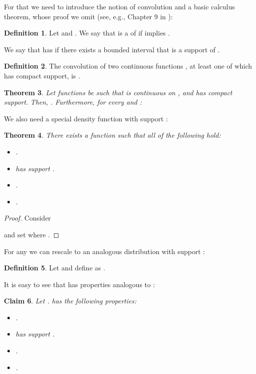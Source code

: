 \documentclass{daj}
\newcommand{\1}{\mathbbm{1}}
\theoremstyle{plain}
\newtheorem{theorem}{Theorem}[section]
\newtheorem{claim}[theorem]{Claim}
\theoremstyle{definition}
\newtheorem{definition}[theorem]{Definition}
\begin{document}
For that we need to introduce the notion of convolution and a basic calculus 
theorem, whose proof we omit (see, e.g., Chapter 9 in \cite{Rud87}):
\begin{definition}
Let  and . We say
that  is a  of  if  implies .

We say that  has  if there exists a bounded
interval  that is a support of .
\end{definition}

\begin{definition}
The convolution  of two continuous functions 
, at least one of which has
compact support,
is .
\end{definition}

\begin{theorem}
\label{thm:convolution-differentiation}
Let functions  be such that  is continuous 
on ,  and  has compact support. 
Then, .
Furthermore, for every  and :

\end{theorem}

We also need a special density function with support :

\begin{theorem}
\label{thm:smooth-distribution}
There exists a function 
such that all of the following hold:
\begin{itemize}
\item .
\item  has support .
\item .
\item .
\end{itemize}
\end{theorem}
\begin{proof}
Consider

and set  where .
\end{proof}

For any  we can rescale
 to an analogous distribution with support :
\begin{definition}
Let  and define 
as .
\end{definition}

It is easy to see that  has properties analogous to :
\begin{claim}
Let .  has the following properties:
\begin{itemize}
\item .
\item  has support .
\item .
\item .
\end{itemize}
\end{claim}
\end{document}
